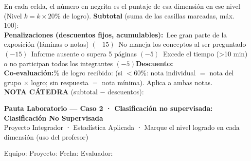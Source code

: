 \documentclass[11pt,letterpaper]{article}
\newcommand{\chk}{\framebox[0.42cm]{\rule{0pt}{0.30cm}}}
\begin{document}
\vspace{0.2cm}
{\small
En cada celda, el número en negrita es el puntaje de esa dimensión en ese nivel (Nivel $k = k\times 20\%$ de logro). \textbf{Subtotal} (suma de las casillas marcadas, máx. 100): \underline{\hspace{2cm}}\\[0.2cm]
\textbf{Penalizaciones (descuentos fijos, acumulables):}\quad \chk\ Lee gran parte de la exposición (láminas o notas) $(-15)$\quad \chk\ No maneja los conceptos al ser preguntado $(-15)$\quad \chk\ Informe ausente o supera 5 páginas $(-5)$\quad \chk\ Excede el tiempo (>10 min) o no participan todos los integrantes $(-5)$\quad \textbf{Descuento:} \underline{\hspace{1.6cm}}\\[0.2cm]
\textbf{Co-evaluación:}\quad \% de logro recibido: \underline{\hspace{1.8cm}}\quad (si $<60\%$: nota individual $=$ nota del grupo $\times$ logro; sin respuesta $=$ nota mínima). Aplica a ambas notas.\\[0.2cm]
\textbf{NOTA CÁTEDRA} (subtotal $-$ descuentos): \underline{\hspace{2.2cm}}
}

\clearpage
\begin{center}
{\large \textbf{Pauta Laboratorio --- Caso 2 · Clasificación no supervisada: Clasificación No Supervisada}}\\[0.1cm]
{\footnotesize Proyecto Integrador · Estadística Aplicada · Marque el nivel logrado en cada dimensión (uso del profesor)}
\end{center}
\vspace{0.05cm}
{\small Equipo: \underline{\hspace{5cm}}\quad Proyecto: \underline{\hspace{5.5cm}}\quad Fecha: \underline{\hspace{2.6cm}}\quad Evaluador: \underline{\hspace{3.5cm}}}
\vspace{0.15cm}
\end{document}
